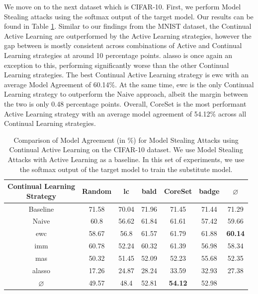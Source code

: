 We move on to the next dataset which is CIFAR-10. First, we perform Model Stealing attacks using the softmax output of the target model. Our results can be found in Table \ref{fig:ModelStealingCIFAR10Softmax}. Similar to our findings from the MNIST dataset, the Continual Active Learning
are outperformed by the Active Learning strategies, however the gap between is mostly consistent across combinations of Active and Continual Learning strategies at around 10 percentage points. \gls{alasso} is once again an exception to this, performing significantly worse than the other
Continual Learning strategies. The best Continual Active Learning strategy is \gls{ewc} with an average Model Agreement of 60.14\%. At the same time, \gls{ewc} is the only Continual Learning strategy to outperform the Naive approach, albeit the margin between the two is only 0.48 percentage points.
Overall, CoreSet is the most performant Active Learning strategy with an average model agreement of 54.12\% across all Continual Learning strategies. \par

\begin{table}[h]
    \centering
    \begin{tabular}{c | c c c c c | c} 
        \hline
        \diagbox[width=11em]{Active \\ Learning Strategy}{Continual Learning \\ Strategy} & Random & \gls{lc} & \gls{bald} & CoreSet & \gls{badge} & $\varnothing$\\ 
        \hline 
        Baseline & 71.58 & 70.04 & 71.96 & 71.45 & 71.44 & 71.29\\
        \hline
        Naive & 60.8 & 56.62 & 61.84 & 61.61 & 57.42 & 59.66 \\
        \gls{ewc} & 58.67 & 56.8 & 61.57 & 61.79 & 61.88 & \textbf{60.14}\\
        \gls{imm} & 60.78 & 52.24 & 60.32 & 61.39 & 56.98 & 58.34 \\
        \gls{mas} & 50.32 & 51.45 & 52.09 & 52.23 & 55.68 & 52.35\\
        \gls{alasso} & 17.26 & 24.87 & 28.24 & 33.59 & 32.93 & 27.38\\
        \hline
        $\varnothing$ & 49.57 & 48.4 & 52.81 & \textbf{54.12} & 52.98\\
        \hline
    \end{tabular}
    \caption[Model agreement of Continual Learning strategies on CIFAR-10 using softmax output]{Comparison of Model Agreement (in \%) for Model Stealing Attacks using Continual Active Learning on the CIFAR-10 dataset. We use Model Stealing Attacks with Active Learning as a baseline. In this set of experiments,
    we use the softmax output of the target model to train the substitute model.}
    \label{fig:ModelStealingCIFAR10Softmax}
\end{table}

